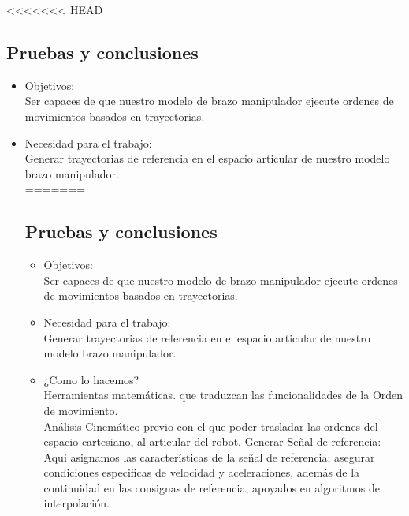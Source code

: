 <<<<<<< HEAD
\subsection{Pruebas y conclusiones}

\begin{itemize}

\item Objetivos: \\

Ser capaces de que nuestro modelo de brazo manipulador ejecute ordenes de movimientos basados en trayectorias.\\



\item Necesidad para el trabajo: \\

Generar trayectorias de referencia en el espacio articular de nuestro modelo brazo manipulador.\\


=======
	\subsection{Pruebas y conclusiones}
	\begin{itemize}
		\item Objetivos: \\
		Ser capaces de que nuestro modelo de brazo manipulador ejecute ordenes de movimientos basados en trayectorias.\\

		\item Necesidad para el trabajo: \\
		Generar trayectorias de referencia en el espacio articular de nuestro modelo brazo manipulador.\\

		\item ¿Como lo hacemos? \\ 
		Herramientas matemáticas. que traduzcan las funcionalidades de la Orden de movimiento. \\ 
		Análisis Cinemático previo con el que poder trasladar las ordenes del espacio cartesiano, al articular del robot.
		Generar Señal de referencia: Aqui asignamos las características de la señal de referencia; asegurar condiciones 
		especificas de velocidad y aceleraciones, además de la continuidad en las consignas de referencia, apoyados en algoritmos
		de interpolación. \\ 


\end{itemize}
\end{itemize}
